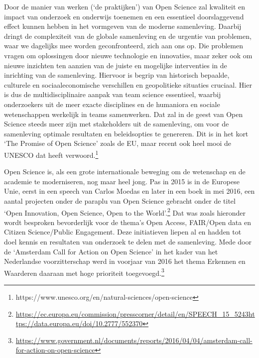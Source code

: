 \documentclass{jote-book}
\begin{document}
	Door de manier van werken (‘de praktijken') van Open Science zal kwaliteit en impact van onderzoek en onderwijs toenemen en een essentieel doorslaggevend effect kunnen hebben in het vormgeven van de moderne samenleving. Daarbij dringt de complexiteit van de globale samenleving en de urgentie van problemen, waar we dagelijks mee worden geconfronteerd, zich aan ons op. Die problemen vragen om oplossingen door nieuwe technologie en innovaties, maar zeker ook om nieuwe inzichten ten aanzien van de juiste en mogelijke interventies in de inrichting van de samenleving. Hiervoor is begrip van historisch bepaalde, culturele en sociaaleconomische verschillen en geopolitieke situaties cruciaal. Hier is dus de multidisciplinaire aanpak van team science essentieel, waarbij onderzoekers uit de meer exacte disciplines en de humaniora en sociale wetenschappen werkelijk in teams samenwerken. Dat zal in de geest van Open Science steeds meer zijn met stakeholders uit de samenleving, om voor de samenleving optimale resultaten en beleidsopties te genereren. Dit is in het kort ‘The Promise of Open Science' zoals de EU, maar recent ook heel mooi de UNESCO dat heeft verwoord.\footnote{https://www.unesco.org/en/natural-sciences/open-science}



	Open Science is, als een grote internationale beweging om de wetenschap en de academie te moderniseren, nog maar heel jong. Pas in 2015 is in de Europese Unie, eerst in een speech van Carlos Moedas en later in een boek in mei 2016, een aantal projecten onder de paraplu van Open Science gebracht onder de titel ‘Open Innovation, Open Science, Open to the World'.\footnote{\href{https://ec.europa.eu/commission/presscorner/detail/en/SPEECH_15_5243}{https://ec.europa.eu/commission/presscorner/detail/en/SPEECH\_15\_5243}\href{https://data.europa.eu/doi/10.2777/552370}{https://data.europa.eu/doi/10.2777/552370}} Dat was zoals hieronder wordt besproken bevorderlijk voor de thema's Open Access, FAIR/Open data en Citizen Science/Public Engagement. Deze initiatieven liepen al en hadden tot doel kennis en resultaten van onderzoek te delen met de samenleving. Mede door de ‘Amsterdam Call for Action on Open Science' in het kader van het Nederlandse voorzitterschap werd in voorjaar van 2016 het thema Erkennen en Waarderen daaraan met hoge prioriteit toegevoegd.\footnote{\href{https://www.government.nl/documents/reports/2016/04/04/amsterdam-call-for-action-on-open-science}{https://www.government.nl/documents/reports/2016/04/04/amsterdam-call-for-action-on-open-science}}
\end{document}
